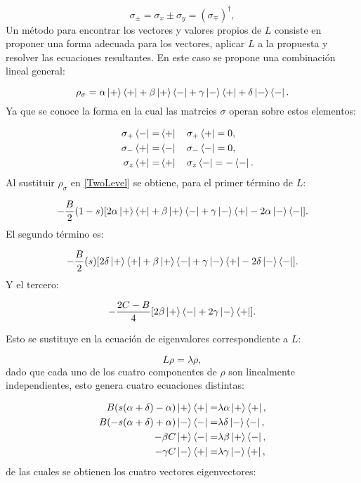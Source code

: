 \documentclass[a4paper,10pt]{report}
\begin{document}
\begin{equation}
\sigma_{\pm} = \sigma_x \pm \sigma_y = (\sigma_{\mp}) ^\dagger,
\end{equation} Un método \cite{BarnettSD} para encontrar los vectores y valores propios de $L$ consiste en proponer una forma adecuada para los vectores, aplicar $L$ a la propuesta y resolver las ecuaciones resultantes. En este caso se propone una combinación lineal general:

\begin{equation}
\rho_\sigma = \alpha\Ket{+}\Bra{+}+\beta\Ket{+}\Bra{-}+\gamma\Ket{-}\Bra{+}+\delta\Ket{-}\Bra{-}.
\end{equation} Ya que se conoce la forma en la cual las matrcies $\sigma$ operan sobre estos elementos:

\begin{align*}
&&\sigma_{+}\Bra{-} =& \Bra{+} \quad \sigma_{+}\Bra{+} = 0, \\
&&\sigma_{-}\Bra{+} =& \Bra{-} \quad \sigma_{-}\Bra{-} = 0, \\
&&\sigma_{z}\Bra{+} =& \Bra{+} \quad \sigma_{z}\Bra{-} = -\Bra{-}.
\end{align*} Al sustituir $\rho_{\sigma}$ en \eqref{TwoLevel} se obtiene, para el primer término de $L$:

\begin{equation}
-\frac{B}{2}(1-s)[2\alpha\Ket{+}\Bra{+}+\beta\Ket{+}\Bra{-}+\gamma\Ket{-}\Bra{+}-2\alpha\Ket{-}\Bra{-}].
\end{equation} El segundo término es:

\begin{equation}
-\frac{B}{2}(s)[2\delta\Ket{+}\Bra{+}+\beta\Ket{+}\Bra{-}+\gamma\Ket{-}\Bra{+}-2\delta\Ket{-}\Bra{-}].
\end{equation} Y el tercero:

\begin{equation}
-\frac{2C-B}{4}[2\beta\Ket{+}\Bra{-}+2\gamma\Ket{-}\Bra{+}].
\end{equation}

Esto se sustituye en la ecuación de eigenvalores correspondiente a $L$:

\begin{equation}
L\rho = \lambda\rho,
\end{equation} dado que cada uno de los cuatro componentes de $\rho$ son linealmente independientes, esto genera cuatro ecuaciones distintas:

\begin{align}
B(s(\alpha+\delta)-\alpha)\Ket{+}\Bra{+} =& \lambda\alpha\Ket{+}\Bra{+},\\
B(-s(\alpha+\delta)+\alpha)\Ket{-}\Bra{-} =& \lambda\delta\Ket{-}\Bra{-},\\
-\beta C \Ket{+}\Bra{-} =& \lambda \beta \Ket{+}\Bra{-}, \\
-\gamma C \Ket{-}\Bra{+} =& \lambda \gamma \Ket{-}\Bra{+},
\end{align}de las cuales se obtienen los cuatro vectores eigenvectores:
\end{document}
